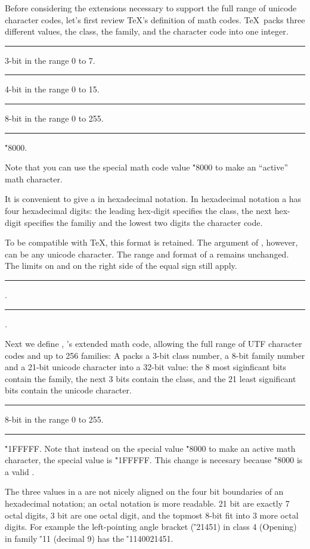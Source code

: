 Before considering the extensions necessary to support the full range
of unicode character codes, let's first review \TeX's definition of
math codes. \TeX\ packs three different values, the class, the family,
and the character code into one integer.
\medskip
\rule{}: 3-bit  in the range 0 to 7.
\rule{}: 4-bit  in the range 0 to 15.
\rule{}: 8-bit  in the range 0 to 255.
\rule{}:  \OR \.{"8000}.
\medskip

Note that you can use the special math code value \.{"8000}
to make an ``active'' math character.

It is convenient to give a  in hexadecimal notation.
In hexadecimal notation a  has four hexadecimal digits:
the leading hex-digit specifies the class,
the next hex-digit specifies the familiy and the lowest two digits
the character code.

To be compatible with \TeX, this format is retained.
The argument of  , however, can be
any unicode character. The range and format of a  remains unchanged.
The limits on  and  on the right side of the equal sign
still apply.
\medskip
\rule{}:
.
\rule{}:
 \opt{\.{=}} .
\medskip

Next we define , \HiTeX's extended math code, allowing the
full range of UTF character codes and up to 256 families:
A  packs a 3-bit class number, a 8-bit family number
and a 21-bit unicode character
into a 32-bit value: the 8 most siginficant bits contain the family, the
next 3 bits contain the class, and the 21 least significant bits contain
the unicode character.
\medskip
\rule{}: 8-bit  in the range 0 to 255.
\rule{}:\OR \.{"1FFFFF}.
\medskip
Note that instead on the special  value \.{"8000} to make an active math character,
the special  value is  \.{"1FFFFF}. This change is necesary because \.{"8000}
is a valid .

The three values in a  are not nicely aligned
on the four bit boundaries of an hexadecimal notation; an octal notation is
more readable. 21 bit are exactly 7 octal digits, 3 bit are one octal digit, and
the topmost 8-bit fit into 3 more octal digits. For example the left-pointing angle bracket
(\.{'21451}) in class 4 (Opening) in family \.{'11} (decimal 9)
has the  \.{'1140021451}.

